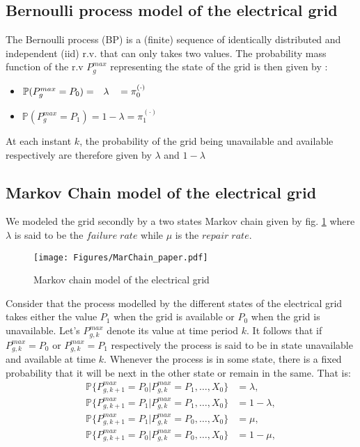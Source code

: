 \documentclass[conference]{IEEEtran}
\begin{document}
 \subsection{Bernoulli process model of the electrical grid}
 The Bernoulli process (BP) is a (finite) sequence of identically distributed and independent (iid) r.v. that can only takes two values. The probability mass function of the r.v  $P_g^{max}$ representing the state of the  grid is then given by :
 \begin{itemize}
    \item $\mathbb{P}(P_g^{max} = P_0) = \hspace{7px}\lambda \hspace{9px} = \pi_0^{(\cdot)} $
    \item $\mathbb{P}(P_g^{max} = P_1)= 1-\lambda= \pi_1^{(\cdot)}$ 
\end{itemize}
At each instant $k$, the probability of the grid being unavailable and available respectively are therefore given by $\lambda$ and $ 1-\lambda$

\subsection{Markov Chain model of the electrical grid }
 We modeled the grid secondly by a two states Markov chain given by fig. \ref{fig:MarChain} where $\lambda$ is said to be the $failure \; rate$ while $\mu$ is the $repair\; rate$.
 \begin{figure}[!ht]
        \begin{center}
                \texttt{[image: Figures/MarChain\_paper.pdf]}
        \end{center}
        \caption{Markov chain model of the electrical grid}
        \label{fig:MarChain}
\end{figure}
Consider that the process modelled by the different states of the electrical grid takes either the value $P_1$ when the grid is available or $P_0$ when the grid is unavailable. Let's $P^{max}_{g,k}$ denote its value at time period $k$. It follows that if $P_{g,k}^{max} = P_0$ or $P_{g,k}^{max} = P_1$ respectively the process is said to be in state unavailable and available at time $k$. Whenever the process is in some state, there is a fixed probability that it will be next in the other state or remain in the same. That is: 
\begin{subequations}\label{eq:MarChain}
\begin{align}
    \mathbb{P} \lbrace P^{max}_{g,k+1} =  P_0 | P^{max}_{g,k} = P_1, \ldots, X_0 \rbrace  &= \lambda, \\
    \mathbb{P} \lbrace P^{max}_{g,k+1} =  P_1 | P^{max}_{g,k} = P_1, \ldots, X_0 \rbrace  &= 1-\lambda, \\
    \mathbb{P} \lbrace P^{max}_{g,k+1} =  P_1 | P^{max}_{g,k} = P_0, \ldots, X_0 \rbrace  &= \mu, \\
    \mathbb{P} \lbrace P^{max}_{g,k+1} =  P_0 | P^{max}_{g,k } = P_0, \ldots, X_0 \rbrace  &= 1-\mu,
\end{align}
\end{subequations}
\end{document}
